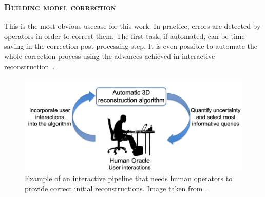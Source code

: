         \subsubsection{\textsc{Building model correction}}
            This is the most obvious usecase for this work.
            In practice, errors are detected by operators in order to correct them.
            The first task, if automated, can be time saving in the correction post-processing step.
            It is even possible to automate the whole correction process using the advances achieved in interactive reconstruction~\parencite{kowdle2011active}.
            \begin{figure}[htpb]
                \centering
                \includegraphics[width=.7\textwidth]{images/introduction/use/active_learning_kowdle}
                \caption[
                    Example of an interactive pipeline that needs human operators to provide correct initial reconstructions.
                ]{
                    \label{fig::corrections}
                    Example of an interactive pipeline that needs human operators to provide correct initial reconstructions.
                    Image taken from~\parencite{kowdle2011active}.
                }
            \end{figure}

